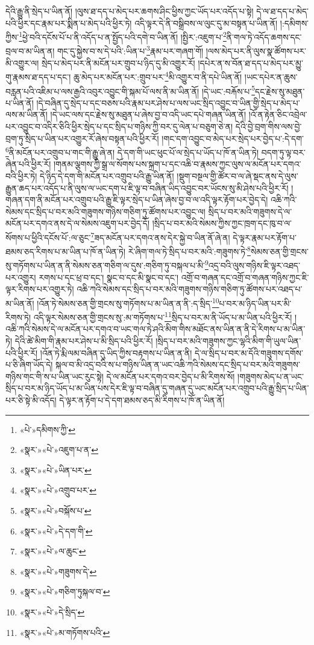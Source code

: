 དེའི་རྒྱུ་ནི་སྲེད་པ་ཡིན་ནོ། །ལུས་ཐ་དད་པ་མེད་པར་ཆགས་ཤིང་ཕྱིས་ཀྱང་ཡོད་པར་འདོད་པ་སྟེ། དེ་ལ་ཐ་དད་པ་མེད་པའི་ཕྱིར་དང་རྣམ་པར་སྨིན་པ་མེད་པའི་ཕྱིར་ཏེ། འདི་ལྟར་དེ་ནི་བསྒྲིབས་ལ་ལུང་དུ་མ་བསྟན་པ་ཡིན་ནོ། །:དམིགས་ཀྱིས་\footnote{«པེ་»དམིགས་ཀྱི་}ཕྱེ་བའི་དངོས་པོ་པ་ནི་འདོད་པ་ན་སྤྱོད་པའི་དགེ་བ་ཡིན་ནོ། །སྤྱིར་:འཇུག་པ་\footnote{«སྣར་»«པེ་»འཇུག་པ་ན་}ནི་གལ་ཏེ་འདོད་ཆགས་དང་བྲལ་བ་མ་ཡིན་ན། གང་དུ་སྐྱེས་བ་ས་དེ་པའི་:ཡིན་པ་\footnote{«སྣར་»«པེ་»ཡིན་པར་}རྣམ་པར་གཞག་གོ། །ལས་མེད་པར་ནི་ལུས་སྣ་ཚོགས་པར་མི་འགྱུར་ལ། སྲེད་པ་མེད་པར་ནི་མངོན་པར་གྲུབ་པ་ཉིད་དུ་མི་འགྱུར་རོ། །དཔེར་ན་ས་བོན་ཐ་དད་པ་མེད་པར་མྱུ་གུ་རྣམས་ཐ་དད་པ་དང་། ཆུ་མེད་པར་མངོན་པར་:གྲུབ་པར་\footnote{«སྣར་»«པེ་»འགྲུབ་པར་}མི་འགྱུར་བ་ནི་དཔེ་ཡིན་ནོ། །ཡང་དཔེར་ན་ཆུས་བརླན་པའི་འཇིམ་པ་ལས་རྒྱའི་འབུར་འབྱུང་གི་སྐམ་པོ་ལས་ནི་མ་ཡིན་ནོ། །དེ་ཡང་:བརྐོས་པ་\footnote{«སྣར་»«པེ་»བསྐོས་པ་}དང་རྗེས་སུ་མཐུན་པ་ཡིན་ནོ། །དེ་བཞིན་དུ་སྲེད་པ་དང་བཅས་པའི་རྣམ་པར་ཤེས་པ་ལས་ཡང་སྲིད་འབྱུང་བ་ཡིན་གྱི་སྲེད་པ་མེད་པ་ལས་མ་ཡིན་ནོ། །དེ་ཡང་ལས་དང་རྗེས་སུ་མཐུན་པ་ཞེས་བྱ་བ་འདི་ཡང་དཔེ་གཞན་ཡིན་ནོ། །འོ་ན་རྟེན་ཅིང་འབྲེལ་པར་འབྱུང་བ་འདིར་ཅིའི་ཕྱིར་སྲེད་པ་དང་སྲིད་པ་གཉིས་ཀྱི་བར་དུ་ལེན་པ་བཅུག་ཅེ་ན། དེའི་བྱེ་བྲག་གིས་ལས་བྱེ་བྲག་ཏུ་སྲིད་པ་ཡིན་པར་འགྱུར་རོ་ཞེས་བསྟན་པའི་ཕྱིར་རོ། །གང་དག་འབྱུང་བ་མེད་པར་སྲེད་པར་བྱེད་པ་:དེ་དག་\footnote{«སྣར་»«པེ་»དེ་དག་གི་}ནི་མངོན་པར་འགྲུབ་པ་གང་གི་རྒྱུ་ཞེ་ན། དེ་དག་གི་ཡང་ཕུང་པོ་ལ་སྲེད་པ་ཡོད་པ་ཁོ་ན་ཡིན་ཏེ། བདག་ཏུ་ལྟ་བར་ཞེན་པའི་ཕྱིར་རོ། །གནམ་ལྕགས་ཀྱི་སྒྲ་ལ་སོགས་པས་སྐྲག་པ་དང་འཆི་བ་རྣམས་ཀྱང་ལུས་ལ་མངོན་པར་དགའ་བའི་ཕྱིར་ཏེ། དེ་ཉིད་དེ་དག་གི་མངོན་པར་འགྲུབ་པའི་རྒྱུ་ཡིན་ནོ། །སྡུག་བསྔལ་གྱི་ཚོར་བ་ལ་ཞེ་སྡང་ནས་དེ་ལུས་རྒྱུན་ཆད་པར་འདོད་པ་ནི་ལུས་ལ་ཡང་དག་པ་ཇི་ལྟ་བ་བཞིན་ཡིད་འབྱུང་བར་ཡོངས་སུ་མི་ཤེས་པའི་ཕྱིར་རོ། །གཞན་དག་ནི་མངོན་པར་འགྲུབ་པའི་རྒྱུ་ཇི་ལྟར་སྲེད་པ་ཡིན་ཞེས་བྱ་བ་ལ་འདི་ལྟར་རྟོག་པར་བྱེད་དེ། འཆི་ཀའི་སེམས་དང་སྲིད་པ་བར་མའི་གཟུགས་གཉིས་གཅིག་ཏུ་ཚོགས་པར་འབྱུང་ལ། སྲིད་པ་བར་མའི་གཟུགས་དེ་ལ་མངོན་པར་དགའ་ནས་དེ་ལ་སེམས་འཇུག་པར་བྱེད་དོ། །སྲིད་པ་བར་མའི་སེམས་ཀྱིས་ཀྱང་ཁྲག་དང་ཁུ་བ་ལ་སོགས་པ་ཕྱིའི་དངོས་པོ་:ལ་ཅུང་\footnote{«སྣར་»«པེ་»ལ་ཆུང་}ཟད་མངོན་པར་དགའ་ནས་དེར་སྐྱེ་བ་ཡིན་ནོ་ཞེ་ན། དེ་ལྟར་རྣམ་པར་རྟོག་པ་ཐམས་ཅད་རིགས་པ་མ་ཡིན་པ་ཁོ་ན་ཡིན་ཏེ། རེ་ཞིག་གལ་ཏེ་སྲིད་པ་བར་མའི་:གཟུགས་ཏེ་\footnote{«སྣར་»«པེ་»གཟུགས་དེ་}སེམས་ཅན་གྱི་གྲངས་སུ་གཏོགས་པ་ཡིན་ན་ནི་སེམས་ཅན་གཅིག་ལ་དུས་:གཅིག་ཏུ་བསྐལ་པ་མི་\footnote{«སྣར་»«པེ་»གཅིག་ཏུསྐལ་བ་}འདྲ་བའི་ལུས་གཉིས་ཇི་ལྟར་འཐད་པར་འགྱུར། རགས་པ་དང་ཕྲ་བ་དང་། སྣང་བ་དང་མི་སྣང་བ་དང་། འགྲོ་བ་གཞན་དང་འགྲོ་བ་གཞན་གཉིས་ཀྱང་ཇི་ལྟར་རིགས་པར་འགྱུར་ཏེ། འཆི་ཀའི་སེམས་དང་སྲིད་པ་བར་མའི་གཟུགས་གཉིས་གཅིག་ཏུ་ཚོགས་པར་འཐད་པ་མ་ཡིན་ནོ། །འོན་ཏེ་སེམས་ཅན་གྱི་གྲངས་སུ་གཏོགས་པ་མ་ཡིན་ན་ནི་:ད་སྲིད་\footnote{«སྣར་»«པེ་»དེ་སྲིད་}པ་བར་མ་ཉིད་ཡིན་པར་མི་རིགས་ཏེ། འདི་ལྟར་སེམས་ཅན་གྱི་གྲངས་སུ་:མ་གཏོགས་པ་\footnote{«སྣར་»«པེ་»མ་གཏོགས་པའི་}སྲིད་པ་བར་མ་ནི་ཡོད་པ་མ་ཡིན་པའི་ཕྱིར་རོ། །འཆི་ཀའི་སེམས་དེ་ལ་མངོན་པར་དགའ་བ་ཡང་གལ་ཏེ་ཤའི་མིག་གིས་མཐོང་ནས་ཡིན་ན་ནི་དེ་རིགས་པ་མ་ཡིན་ཏེ། དེའི་ཚེ་མིག་གི་རྣམ་པར་ཤེས་པ་མི་སྲིད་པའི་ཕྱིར་རོ། །སྲིད་པ་བར་མའི་གཟུགས་ཀྱང་ལྷའི་མིག་གི་ཡུལ་ཡིན་པའི་ཕྱིར་རོ། །འོན་ཏེ་རྨི་ལམ་བཞིན་དུ་ཡིད་ཀྱིས་བརྟགས་པ་ཡིན་ན་ནི། དེ་ལ་སྲིད་པ་བར་མ་དོའི་གཟུགས་དགོས་པ་ཅི་ཞིག་ཡོད་དེ། སྐལ་བ་མི་འདྲ་བའི་ས་པ་གཉིས་ཡིན་ན་ཡང་འཆི་ཀའི་སེམས་དང་སྲིད་པ་བར་མའི་གཟུགས་གཉིས་གང་གི་ས་པ་ཡིན་ཡང་རུང་སྟེ། དེ་ལ་མངོན་པར་དགའ་བར་བྱེད་པ་མི་རིགས་སོ། །གཟུགས་མེད་པ་ན་ཡང་སྲིད་པ་བར་མ་ཉིད་ཡོད་པ་མ་ཡིན་པས་དེར་ཇི་ལྟ་བ་བཞིན་དུ་གཞན་དུ་ཡང་མངོན་པར་འགྲུབ་པའི་རྒྱུ་སྲིད་པ་ཡིན་པར་ཅི་སྟེ་མི་འདོད། དེ་ལྟར་ན་རྟོག་པ་དེ་དག་ཐམས་ཅད་མི་རིགས་པ་ཁོ་ན་ཡིན་ནོ། 